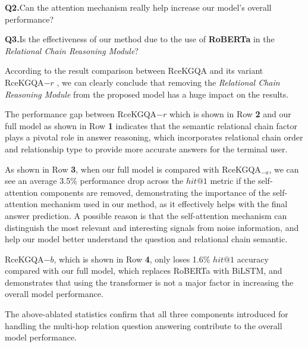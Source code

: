 \documentclass[pdflatex,sn-mathphys]{sn-jnl}%
\theoremstyle{thmstyleone}%
\theoremstyle{thmstyletwo}%
\theoremstyle{thmstylethree}%
\begin{document}
\textbf{Q2.}\quad Can the attention mechanism really help increase our model's overall performance?

\textbf{Q3.}\quad Is the effectiveness of our method due to the use of \textbf{RoBERTa} in the \textit{Relational Chain Reasoning Module}?

According to the result comparison between RceKGQA and its variant RceKGQA${-r}$
, we can clearly conclude that removing the \textit{Relational Chain Reasoning Module} from the proposed model has a huge impact on the results. 

The performance gap between RceKGQA${-r}$ which is shown in Row \textbf{2} and our full model as shown in Row \textbf{1} indicates that the semantic relational chain factor plays a pivotal role in answer reasoning, which incorporates relational chain order and relationship type to provide more accurate answers for the terminal user.

As shown in Row \textbf{3}, when our full model is compared with RceKGQA$_{-a}$, we can see an average 3.5\% performance drop across the $hit@1$ metric if the self-attention components are removed, demonstrating the importance of the self-attention mechanism used in our method, as it effectively helps with the final answer prediction. A possible reason is that the self-attention mechanism can distinguish the most relevant and interesting signals from noise information, and help our model better understand the question and relational chain semantic.

RceKGQA${-b}$, which is shown in Row \textbf{4}, only loses 1.6\% $hit@1$ accuracy compared with our full model, which replaces RoBERTa with BiLSTM, and demonstrates that using the transformer is not a major factor in increasing the overall model performance. 

The above-ablated statistics confirm that all three components introduced for handling the multi-hop relation question answering contribute to the overall model performance.
\end{document}
